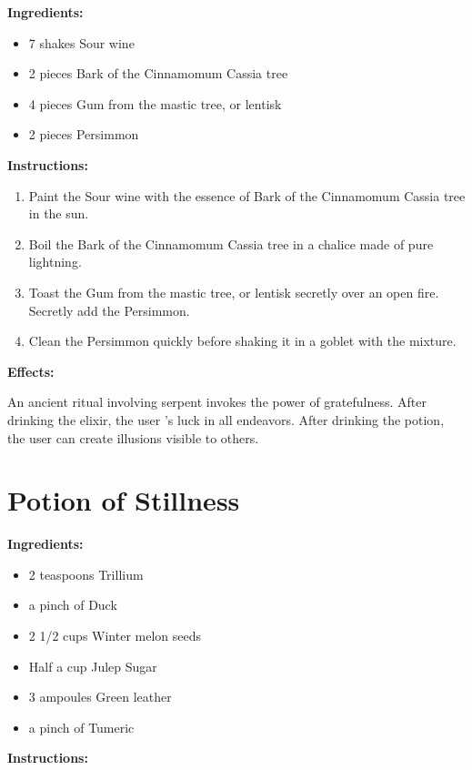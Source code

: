 \documentclass{article}
\begin{document}
\textbf{Ingredients:}

\begin{itemize}
  \item 7 shakes Sour wine
  \item 2 pieces Bark of the Cinnamomum Cassia tree
  \item 4 pieces Gum from the mastic tree, or lentisk
  \item 2 pieces Persimmon
\end{itemize}

\textbf{Instructions:}

\begin{enumerate}
  \item Paint the Sour wine with the essence of Bark of the Cinnamomum Cassia tree in the sun.
  \item Boil the Bark of the Cinnamomum Cassia tree in a chalice made of pure lightning.
  \item Toast the Gum from the mastic tree, or lentisk secretly over an open fire. Secretly add the Persimmon.
  \item Clean the Persimmon quickly before shaking it in a goblet with the mixture.
\end{enumerate}

\textbf{Effects:}

An ancient ritual involving serpent invokes the power of gratefulness. After drinking the elixir, the user 's luck in all endeavors. After drinking the potion, the user can create illusions visible to others.

\newpage
\section*{Potion of Stillness}

\textbf{Ingredients:}

\begin{itemize}
  \item 2 teaspoons Trillium
  \item a pinch of Duck
  \item 2 1/2 cups Winter melon seeds
  \item Half a cup Julep Sugar
  \item 3 ampoules Green leather
  \item a pinch of Tumeric
\end{itemize}

\textbf{Instructions:}
\end{document}
